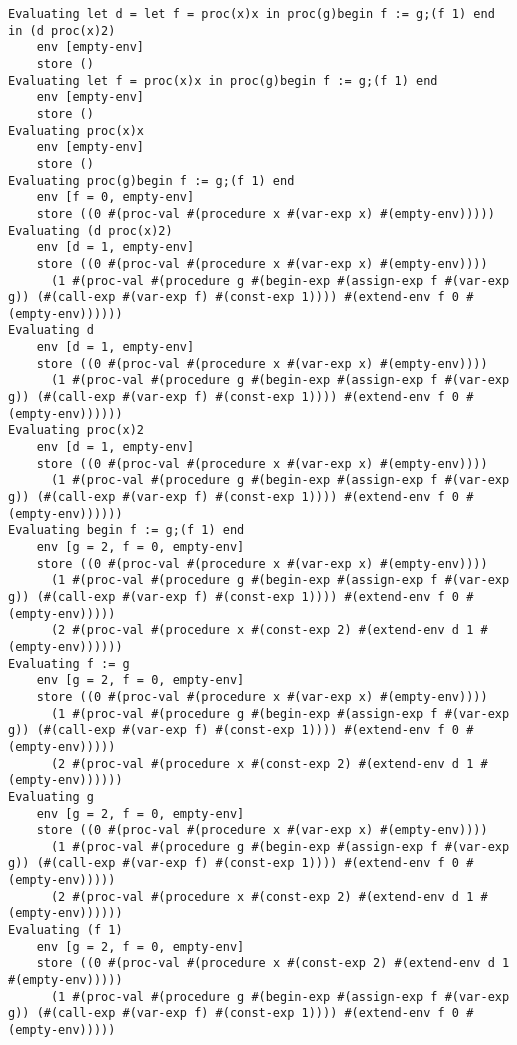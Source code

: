 \documentclass[../main.tex]{subfiles}
\begin{document}
\begin{lstlisting}
Evaluating let d = let f = proc(x)x in proc(g)begin f := g;(f 1) end in (d proc(x)2)
    env [empty-env]
    store ()
Evaluating let f = proc(x)x in proc(g)begin f := g;(f 1) end
    env [empty-env]
    store ()
Evaluating proc(x)x
    env [empty-env]
    store ()
Evaluating proc(g)begin f := g;(f 1) end
    env [f = 0, empty-env]
    store ((0 #(proc-val #(procedure x #(var-exp x) #(empty-env)))))
Evaluating (d proc(x)2)
    env [d = 1, empty-env]
    store ((0 #(proc-val #(procedure x #(var-exp x) #(empty-env))))
      (1 #(proc-val #(procedure g #(begin-exp #(assign-exp f #(var-exp g)) (#(call-exp #(var-exp f) #(const-exp 1)))) #(extend-env f 0 #(empty-env))))))
Evaluating d
    env [d = 1, empty-env]
    store ((0 #(proc-val #(procedure x #(var-exp x) #(empty-env))))
      (1 #(proc-val #(procedure g #(begin-exp #(assign-exp f #(var-exp g)) (#(call-exp #(var-exp f) #(const-exp 1)))) #(extend-env f 0 #(empty-env))))))
Evaluating proc(x)2
    env [d = 1, empty-env]
    store ((0 #(proc-val #(procedure x #(var-exp x) #(empty-env))))
      (1 #(proc-val #(procedure g #(begin-exp #(assign-exp f #(var-exp g)) (#(call-exp #(var-exp f) #(const-exp 1)))) #(extend-env f 0 #(empty-env))))))
Evaluating begin f := g;(f 1) end
    env [g = 2, f = 0, empty-env]
    store ((0 #(proc-val #(procedure x #(var-exp x) #(empty-env))))
      (1 #(proc-val #(procedure g #(begin-exp #(assign-exp f #(var-exp g)) (#(call-exp #(var-exp f) #(const-exp 1)))) #(extend-env f 0 #(empty-env)))))
      (2 #(proc-val #(procedure x #(const-exp 2) #(extend-env d 1 #(empty-env))))))
Evaluating f := g
    env [g = 2, f = 0, empty-env]
    store ((0 #(proc-val #(procedure x #(var-exp x) #(empty-env))))
      (1 #(proc-val #(procedure g #(begin-exp #(assign-exp f #(var-exp g)) (#(call-exp #(var-exp f) #(const-exp 1)))) #(extend-env f 0 #(empty-env)))))
      (2 #(proc-val #(procedure x #(const-exp 2) #(extend-env d 1 #(empty-env))))))
Evaluating g
    env [g = 2, f = 0, empty-env]
    store ((0 #(proc-val #(procedure x #(var-exp x) #(empty-env))))
      (1 #(proc-val #(procedure g #(begin-exp #(assign-exp f #(var-exp g)) (#(call-exp #(var-exp f) #(const-exp 1)))) #(extend-env f 0 #(empty-env)))))
      (2 #(proc-val #(procedure x #(const-exp 2) #(extend-env d 1 #(empty-env))))))
Evaluating (f 1)
    env [g = 2, f = 0, empty-env]
    store ((0 #(proc-val #(procedure x #(const-exp 2) #(extend-env d 1 #(empty-env)))))
      (1 #(proc-val #(procedure g #(begin-exp #(assign-exp f #(var-exp g)) (#(call-exp #(var-exp f) #(const-exp 1)))) #(extend-env f 0 #(empty-env)))))

\end{lstlisting}
\end{document}

